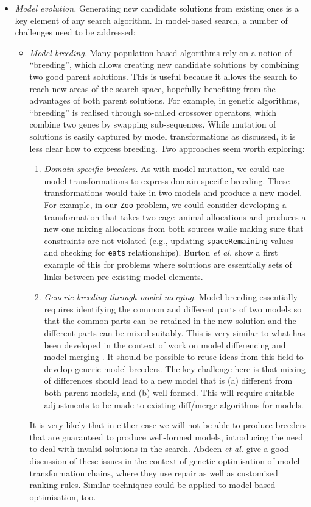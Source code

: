 \begin{itemize}
		\item \emph{Model evolution.} Generating new candidate solutions from existing ones is a key element of any search algorithm. In model-based search, a number of challenges need to be addressed:
					\begin{itemize}
						\item \emph{Model breeding.} Many population-based algorithms rely on a notion of ``breeding'', which allows creating new candidate solutions by combining two good parent solutions. This
						      is useful because it allows the search to reach new areas of the search space, hopefully benefiting from the advantages of both parent solutions. For example, in genetic algorithms,
									``breeding'' is realised through so-called crossover operators, which combine two genes by swapping sub-sequences. While mutation of solutions is easily captured by model
									transformations as discussed, it is less clear how to express breeding. Two approaches seem worth exploring:
									\begin{enumerate}
										\item \emph{Domain-specific breeders.} As with model mutation, we could use model transformations to express domain-specific breeding. These transformations would take in two
										      models and produce a new model. For example, in our \texttt{Zoo} problem, we could consider developing a transformation that takes two cage--animal allocations and produces
													a new one mixing allocations from both sources while making sure that constraints are not violated (e.g., updating \texttt{spaceRemaining} values and checking for 
													\texttt{eats} relationships). Burton \emph{et al.} \cite{Burton+12} show a first example of this for problems where solutions are essentially sets of links between 
													pre-existing model elements.
										\item \emph{Generic breeding through model merging.} Model breeding essentially requires identifying the common and different parts of two models so that the common parts can be
										      retained in the new solution and the different parts can be mixed suitably. This is very similar to what has been developed in the context of work on model differencing and
													model merging \cite{model-diff-merge}. It should be possible to reuse ideas from this field to develop generic model breeders. The key challenge here is that mixing of
													differences should lead to a new model that is (a) different from both parent models, and (b) well-formed. This will require suitable adjustments to be made to existing 
													diff/merge algorithms for models.
									\end{enumerate}
									It is very likely that in either case we will not be able to produce breeders that are guaranteed to produce well-formed models, introducing the need to deal with invalid solutions
									in the search. Abdeen \emph{et al.} \cite{Abdeen+14} give a good discussion of these issues in the context of genetic optimisation of model-transformation chains, where they use
									repair as well as customised ranking rules. Similar techniques could be applied to model-based optimisation, too.
									

\end{itemize}
\end{itemize}

